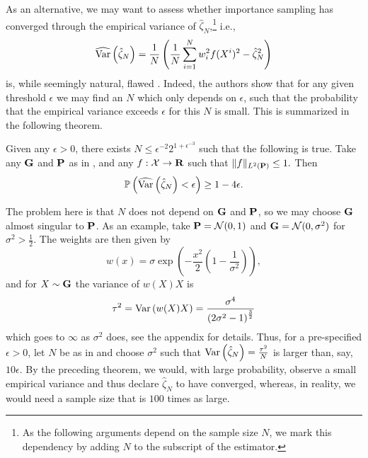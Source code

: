 As an alternative, we may want to assess whether importance sampling has converged through the empirical variance of $\hat \zeta_{N}$,\footnote{As the following arguments depend on the sample size $N$, we mark this dependency by adding $N$ to the subscript of the estimator.} i.e., 
$$
\widehat\var \left( \hat\zeta_{N} \right) = \frac{1}{N}\left(\frac{1}{N} \sum_{i = 1}^N w_{i}^{2} f(X^{i})^{2} - \hat \zeta_{N}^{2}\right)
$$
is, while seemingly natural, flawed \citep{Chatterjee2018Sample}.
Indeed, the authors show that for any given threshold $\epsilon$ we may find an $N$ which only depends on $\epsilon$, such that the probability that the empirical variance exceeds $\epsilon$ for this $N$ is small. This is summarized in the following theorem.

\begin{theorem}
    \label{thm:variance_failure}
    Given any $\epsilon > 0$, there exists  $N \leq \epsilon^{-2} 2^{1 + \epsilon^{-3}}$ such that the following is true. Take any $\G$ and $\P$ as in , and any $f: \mathcal X \to \R$ such that $ \lVert f \rVert_{L^{2}(\P)} \leq 1.$ Then 
    $$
        \mathbb P \left( \widehat \var \left( \hat \zeta_{N} \right) < \epsilon\right) \geq 1 - 4 \epsilon.
    $$
\end{theorem}

The problem here is that $N$ does not depend on $\G$ and $\P$, so we may choose $\G$ almost singular to $\P$. As an example, take $\P = \mathcal N(0, 1)$ and $\G = \mathcal N(0, \sigma^{2})$ for $\sigma^{2} > \frac{1}{2}$. The weights are then given by $$w(x) = \sigma \exp \left( - \frac{x^{2}}{2} \left( 1 - \frac{1}{\sigma^{2}} \right) \right),$$
and for $X \sim \G$ the variance of $w(X)X$ is 
\begin{align}
    \label{eq:variance-wxx}
\tau^{2} = \var \left( w(X)X \right) = \frac{\sigma^{4}}{\left( 2 \sigma^{2} - 1 \right)^{\frac{3}{2}}}
\end{align}
which goes to $\infty$ as $\sigma^2$ does, see the appendix for details. Thus, for a pre-specified $\epsilon > 0$, let $N$ be as in  and choose $\sigma^{2}$ such that $\var \left( \hat\zeta_{N} \right) = \frac {\tau^{2}}N$ is larger than, say, $10\epsilon$. By the preceding theorem, we would, with large probability, observe a small empirical variance and thus declare $\hat\zeta_{N}$ to have converged, whereas, in reality, we would need a sample size that is $100$ times as large.

